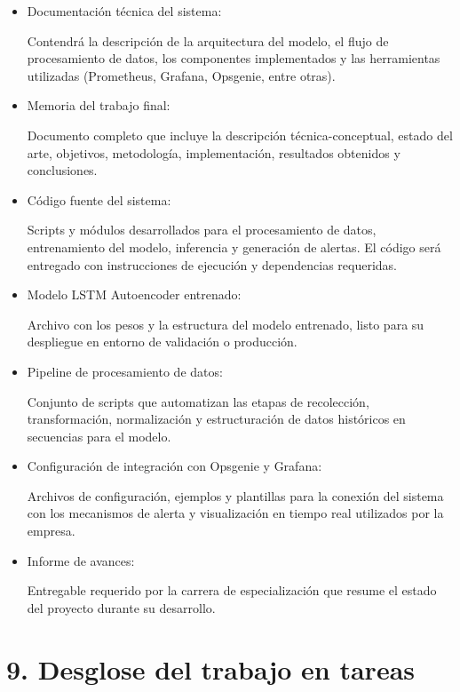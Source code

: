 \documentclass[
11pt, %
]{charter}
\begin{document}
\begin{itemize}
    \item Documentación técnica del sistema:

 Contendrá la descripción de la arquitectura del modelo, el flujo de procesamiento de datos, los componentes implementados y las herramientas utilizadas (Prometheus, Grafana, Opsgenie, entre otras).
    \item Memoria del trabajo final:

 Documento completo que incluye la descripción técnica-conceptual, estado del arte, objetivos, metodología, implementación, resultados obtenidos y conclusiones.
    \item Código fuente del sistema:

 Scripts y módulos desarrollados para el procesamiento de datos, entrenamiento del modelo, inferencia y generación de alertas. El código será entregado con instrucciones de ejecución y dependencias requeridas.
    \item Modelo LSTM Autoencoder entrenado:

 Archivo con los pesos y la estructura del modelo entrenado, listo para su despliegue en entorno de validación o producción.
    \item Pipeline de procesamiento de datos:

 Conjunto de scripts que automatizan las etapas de recolección, transformación, normalización y estructuración de datos históricos en secuencias para el modelo.
    \item Configuración de integración con Opsgenie y Grafana:

 Archivos de configuración, ejemplos y plantillas para la conexión del sistema con los mecanismos de alerta y visualización en tiempo real utilizados por la empresa.
 \item Informe de avances:

Entregable requerido por la carrera de especialización que resume el estado del proyecto durante su desarrollo.
\end{itemize}
    

\section{9. Desglose del trabajo en tareas}
\label{sec:wbs}
\end{document}
